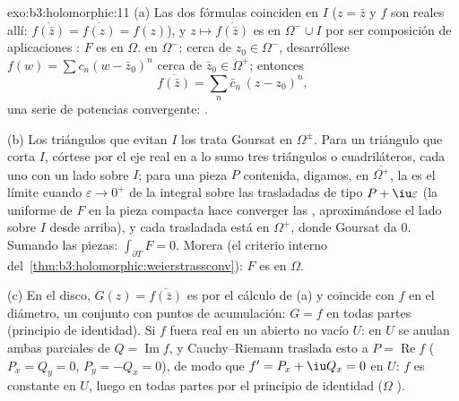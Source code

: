 \begin{solution}{exo:b3:holomorphic:11}
(a) Las dos fórmulas coinciden en $I$ ($z = \bar z$ y $f$ son reales
allí: $\overline{f(\bar z)} = \overline{f(z)} = f(z)$), y
$z \mapsto \overline{f(\bar z)}$ es
 en $\Omega^-\cup I$ por
ser composición de aplicaciones
: $F$ es  en
$\Omega$.  en $\Omega^-$:
cerca de $z_0
\in \Omega^-$, desarróllese $f(w) = \sum c_n(w - \bar z_0)^n$ cerca de
$\bar z_0 \in \Omega^+$; entonces
\[
\overline{f(\bar z)} = \sum_n\bar c_n\,(z - z_0)^n,
\]
una serie de potencias convergente:
.

(b) Los triángulos que evitan $I$ los trata Goursat en $\Omega^\pm$.
Para un triángulo que corta $I$, córtese por el eje real en a lo sumo
tres triángulos o cuadriláteros, cada uno con un lado sobre $I$; para
una pieza $P$ contenida, digamos, en $\overline{\Omega^+}$, la
 es el límite
cuando $\varepsilon \to 0^+$ de la integral sobre las trasladadas de
tipo $P + \iu
\varepsilon$ (la 
uniforme de $F$ en la pieza compacta
hace converger las , aproximándose el lado sobre
$I$ desde arriba), y cada trasladada está en $\Omega^+$, donde Goursat
da $0$. Sumando las piezas: $\int_{\partial T}F = 0$. Morera (el
criterio interno del~\cref{thm:b3:holomorphic:weierstrassconv}): $F$ es
 en $\Omega$.

(c) En el disco, $G(z) = \overline{f(\bar z)}$ es
 por el cálculo de (a) y
coincide con $f$ en el diámetro, un conjunto con puntos de acumulación:
$G = f$ en todas partes (principio de identidad). Si $f$ fuera real en
un abierto no vacío $U$: en $U$ se
anulan ambas parciales de $Q = \operatorname{Im}f$, y Cauchy--Riemann
traslada esto a $P =
\operatorname{Re}f$ ($P_x = Q_y = 0$, $P_y = -Q_x = 0$), de modo que
$f' = P_x + \iu Q_x = 0$ en $U$: $f$ es constante en $U$, luego en todas
partes por el principio de identidad ($\Omega$
).
\end{solution}


